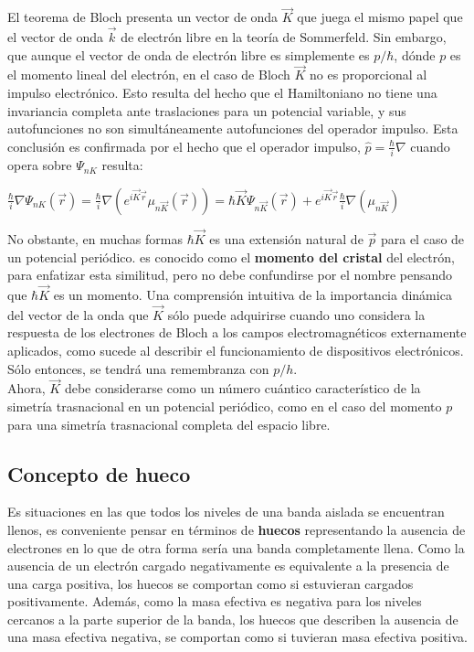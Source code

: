 \documentclass[oneside]{book}
\numberwithin{equation}{section}
\numberwithin{figure}{section}
\numberwithin{table}{section}
\begin{document}
				El teorema de Bloch presenta un vector de onda $\vec{K}$ que juega el mismo papel que el vector de onda $\vec{k}$ de electrón libre en la teoría de Sommerfeld. Sin embargo, que aunque el vector de onda de electrón libre es simplemente es $p/\hbar$, dónde $p$ es el momento lineal del electrón, en el caso de Bloch $\vec{K}$ no es proporcional al impulso electrónico. Esto resulta del hecho que el Hamiltoniano no tiene una invariancia completa ante traslaciones para un potencial variable, y sus autofunciones no son simultáneamente autofunciones del operador impulso. Esta conclusión es confirmada por el hecho que el operador impulso, $\hat{p}=\frac{\hbar}{i}\nabla$ cuando opera sobre $\Psi_{nK}$ resulta:	\\	
			
				\begin{center}
					$\displaystyle \frac{\hbar}{i}\nabla \Psi_{nK}(\vec{r})=\frac{\hbar}{i}\nabla\left(e^{i\vec{K}\vec{r}}\mu_{n\vec{K}}(\vec{r})\right)=\hbar\vec{K}\Psi_{n\vec{K}}(\vec{r})+e^{i\vec{K}\vec{r}}\frac{\hbar}{i}\nabla\left(\mu_{n\vec{K}}\right)$		
				\end{center}	
			
				No obstante, en muchas formas $\hbar\vec{K}$ es una extensión natural de $\vec{p}$ para el caso de un potencial periódico.  es conocido como el \textbf{momento del cristal} del electrón, para enfatizar esta similitud, pero no debe confundirse por el nombre pensando que $\hbar\vec{K}$ es un momento. Una comprensión intuitiva de la importancia dinámica del vector de la onda que $\vec{K}$ sólo puede adquirirse cuando uno considera la respuesta de los electrones de Bloch a los campos electromagnéticos externamente aplicados, como
sucede al describir el funcionamiento de dispositivos electrónicos. Sólo entonces, se tendrá una remembranza con $p/h$.\\

				Ahora, $\vec{K}$ debe considerarse como un número cuántico característico de la simetría trasnacional en un potencial periódico, como en el caso del momento $p$ para una simetría trasnacional completa del espacio libre.
			
			\subsection{Concepto de hueco}
			
				Es situaciones en las que todos los niveles de una banda aislada se encuentran llenos, es conveniente pensar en términos de \textbf{huecos} representando la ausencia de electrones en lo que de otra forma sería una banda completamente llena. Como la ausencia de un electrón cargado negativamente es equivalente a la presencia de una carga positiva, los huecos se comportan como si estuvieran cargados positivamente. Además, como la masa efectiva es negativa para los niveles cercanos a la parte superior de la banda, los huecos que describen la ausencia de una masa efectiva negativa, se comportan como si tuvieran masa efectiva positiva.
								
\end{document}
